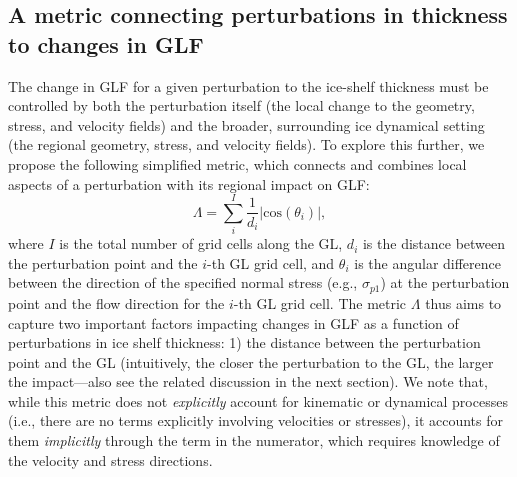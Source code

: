 \documentclass[tc, manuscript]{copernicus}
\begin{document}
\subsection{A metric connecting perturbations in thickness to changes in GLF} \label{new_metric}
The change in GLF for a given perturbation to the ice-shelf thickness must be controlled by both the perturbation itself (the local change to the geometry, stress, and velocity fields) and the broader, surrounding ice dynamical setting (the regional geometry, stress, and velocity fields). To explore this further, we propose the following simplified metric, which connects and combines local aspects of a perturbation with its regional impact on GLF:
\begin{equation}
    \Lambda = \sum_i^I \frac{1}{d_i} |\mathrm{cos} \left(\theta_i\right)|,
    \label{Lambda}
\end{equation}
where $I$ is the total number of grid cells along the GL, $d_i$ is the distance between the perturbation point and the $i$-th GL grid cell, and $\theta_i$ is the angular difference between the direction of the specified normal stress (e.g., $\sigma_{p1}$) at the perturbation point and the flow direction for the $i$-th GL grid cell. The metric $\Lambda$ thus aims to capture two important factors impacting changes in GLF as a function of perturbations in ice shelf thickness: 1) the distance between the perturbation point and the GL (intuitively, the closer the perturbation to the GL, the larger the impact---also see the related discussion in the next section). We note that, while this metric does not \textit{explicitly} account for kinematic or dynamical processes (i.e., there are no terms explicitly involving velocities or stresses), it accounts for them \textit{implicitly} through the term in the numerator, which requires knowledge of the velocity and stress directions. 
\end{document}
